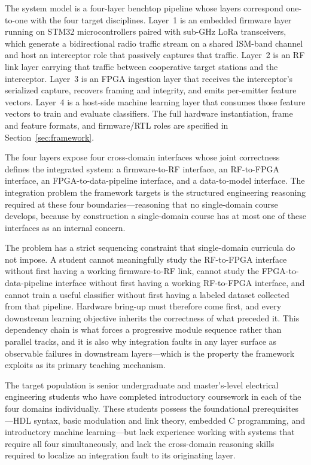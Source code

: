 \documentclass[conference]{IEEEtran}
\begin{document}
The system model is a four-layer benchtop pipeline whose layers correspond one-to-one with the four target disciplines. Layer~1 is an embedded firmware layer running on STM32 microcontrollers paired with sub-GHz LoRa transceivers, which generate a bidirectional radio traffic stream on a shared ISM-band channel and host an interceptor role that passively captures that traffic. Layer~2 is an RF link layer carrying that traffic between cooperative target stations and the interceptor. Layer~3 is an FPGA ingestion layer that receives the interceptor's serialized capture, recovers framing and integrity, and emits per-emitter feature vectors. Layer~4 is a host-side machine learning layer that consumes those feature vectors to train and evaluate classifiers. The full hardware instantiation, frame and feature formats, and firmware/RTL roles are specified in Section~\ref{sec:framework}.

The four layers expose four cross-domain interfaces whose joint correctness defines the integrated system: a firmware-to-RF interface, an RF-to-FPGA interface, an FPGA-to-data-pipeline interface, and a data-to-model interface. The integration problem the framework targets is the structured engineering reasoning required at these four boundaries---reasoning that no single-domain course develops, because by construction a single-domain course has at most one of these interfaces as an internal concern.

The problem has a strict sequencing constraint that single-domain curricula do not impose. A student cannot meaningfully study the RF-to-FPGA interface without first having a working firmware-to-RF link, cannot study the FPGA-to-data-pipeline interface without first having a working RF-to-FPGA interface, and cannot train a useful classifier without first having a labeled dataset collected from that pipeline. Hardware bring-up must therefore come first, and every downstream learning objective inherits the correctness of what preceded it. This dependency chain is what forces a progressive module sequence rather than parallel tracks, and it is also why integration faults in any layer surface as observable failures in downstream layers---which is the property the framework exploits as its primary teaching mechanism.

The target population is senior undergraduate and master's-level electrical engineering students who have completed introductory coursework in each of the four domains individually. These students possess the foundational prerequisites---HDL syntax, basic modulation and link theory, embedded C programming, and introductory machine learning---but lack experience working with systems that require all four simultaneously, and lack the cross-domain reasoning skills required to localize an integration fault to its originating layer.
\end{document}
